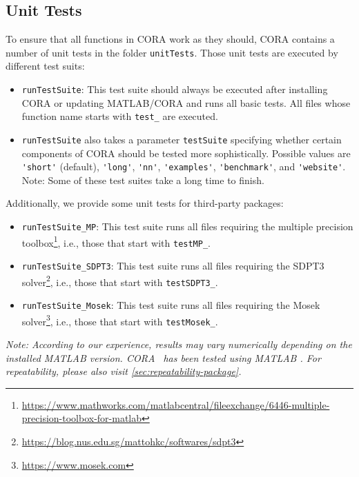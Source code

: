 \subsection{Unit Tests} \label{sec:unitTests}

To ensure that all functions in CORA work as they should, CORA contains a number of unit tests in the folder \texttt{unitTests}.
Those unit tests are executed by different test suits:
\begin{itemize}
 \item \texttt{runTestSuite}: This test suite should always be executed after installing CORA or updating MATLAB/CORA and runs all basic tests.
        All files whose function name starts with \texttt{test\_} are executed.
 \item \texttt{runTestSuite} also takes a parameter \verb|testSuite| specifying whether certain components of CORA should be tested more sophistically.
        Possible values are \verb|'short'| (default), \verb|'long'|, \verb|'nn'|, \verb|'examples'|, \verb|'benchmark'|, and \verb|'website'|.
        Note: Some of these test suites take a long time to finish.
\end{itemize}
Additionally, we provide some unit tests for third-party packages:
\begin{itemize}
 \item \texttt{runTestSuite\_MP}: This test suite runs all files requiring the multiple precision toolbox\footnote{\url{https://www.mathworks.com/matlabcentral/fileexchange/6446-multiple-precision-toolbox-for-matlab}}, i.e., those that start with \texttt{testMP\_}.
 \item \texttt{runTestSuite\_SDPT3}: This test suite runs all files requiring the SDPT3 solver\footnote{\url{https://blog.nus.edu.sg/mattohkc/softwares/sdpt3}}, i.e., those that start with \texttt{testSDPT3\_}.
 \item \texttt{runTestSuite\_Mosek}: This test suite runs all files requiring the Mosek solver\footnote{\url{https://www.mosek.com}}, i.e., those that start with \texttt{testMosek\_}.
\end{itemize}

\textit{
Note: According to our experience, results may vary numerically depending on the installed MATLAB version.
CORA \CORAVERSION\ has been tested using MATLAB \MATLABversion.
For repeatability, please also visit \cref{sec:repeatability-package}.
}
